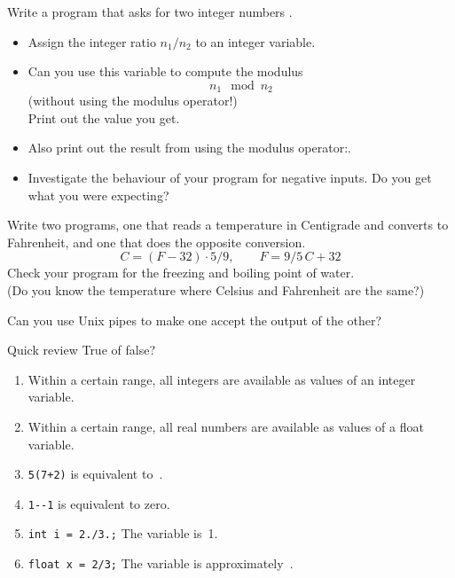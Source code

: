 \begin{exercise}
  \label{ex:modulus}
  Write a program that asks for two integer numbers .
  \begin{itemize}
  \item Assign the integer ratio $n_1/n_2$ to an integer variable.
  \item Can you use this variable to compute the modulus
    \[ n_1\mod n_2 \]
    (without using the  modulus operator!)\\
    Print out the value you get.
  \item Also print out the result from using the modulus
    operator:.
  \item Investigate the behaviour of your program for negative
    inputs. Do you get what you were expecting?
  \end{itemize}
\end{exercise}

\begin{exercise}
  \label{ex:C2F}
  Write two programs, one that reads a temperature in Centigrade and
  converts to Fahrenheit, and one that does the opposite conversion.
  \[ C = (F-32)\cdot 5/9,\qquad F = 9/5\,C+32 \]
  Check your program for the freezing and boiling point of water.\\
  (Do you know the temperature where Celsius and Fahrenheit are the
  same?)
  
  Can you use Unix pipes to make one accept the output of the other?
\end{exercise}

\begin{exercise}{Quick review}
  \label{q:vartypes}
  True of false?
  \begin{enumerate}
  \item Within a certain range, all integers are available as values of an
    integer variable.
  \item Within a certain range, all real numbers are available as values of a
    float variable.
  \item \verb-5(7+2)- is equivalent to~.
  \item \verb+1--1+ is equivalent to zero.
  \item \verb-int i = 2./3.;- The variable  is~1.
  \item \verb-float x = 2/3;- The variable  is approximately~.
  \end{enumerate}
\end{exercise}

